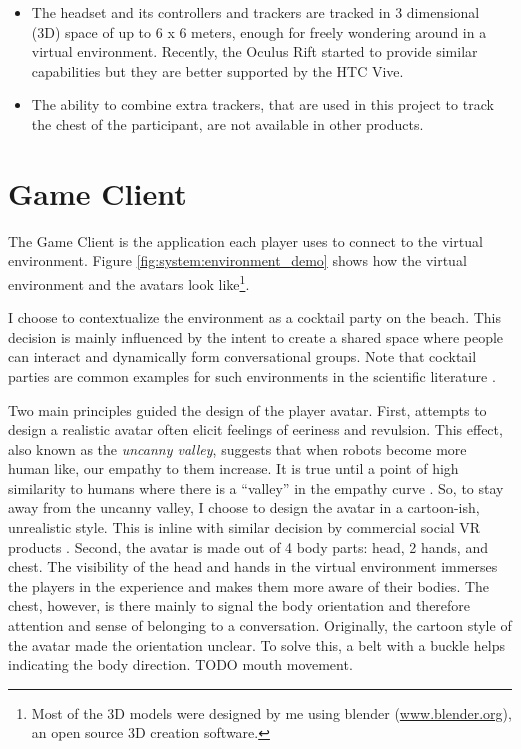 \documentclass[]{simple-thesis}
\begin{document}
\begin{itemize}
  \item The headset and its controllers and trackers are tracked in 3 dimensional (3D) space of up to 6 x 6 meters, enough for freely wondering around in a virtual environment. Recently, the Oculus Rift started to provide similar capabilities but they are better supported by the HTC Vive.
  \item The ability to combine extra trackers, that are used in this project to track the chest of the participant, are not available in other products.
\end{itemize}

\section{Game Client}

The Game Client is the application each player uses to connect to the virtual environment.
Figure \ref{fig:system:environment_demo} shows how the virtual environment and the avatars look like\footnote{Most of the 3D models were designed by me using blender (\href{https://www.blender.org/}{www.blender.org}), an open source 3D creation software.}.

I choose to contextualize the environment as a cocktail party on the beach.
This decision is mainly influenced by the intent to create a shared space where people can interact and dynamically form conversational groups.
Note that cocktail parties are common examples for such environments in the scientific literature \citep{Setti2015}.

Two main principles guided the design of the player avatar.
First, attempts to design a realistic avatar often elicit feelings of eeriness and revulsion.
This effect, also known as the \textit{uncanny valley}, suggests that when robots become more human like, our empathy to them increase.
It is true until a point of high similarity to humans where there is a ``valley'' in the empathy curve \citep{Mori1970}.
So, to stay away from the uncanny valley, I choose to design the avatar in a cartoon-ish, unrealistic style.
This is inline with similar decision by commercial social VR products \citep{Ghosh2017, AltspaceVR2016, Pot2016}.
Second, the avatar is made out of 4 body parts: head, 2 hands, and chest.
The visibility of the head and hands in the virtual environment immerses the players in the experience and makes them more aware of their bodies.
The chest, however, is there mainly to signal the body orientation and therefore attention and sense of belonging to a conversation.
Originally, the cartoon style of the avatar made the orientation unclear.
To solve this, a belt with a buckle helps indicating the body direction.
TODO mouth movement.
\end{document}
